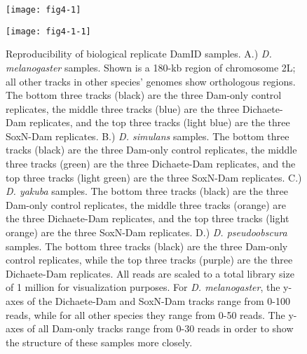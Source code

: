 \begin{figure}[H]
	\centering
	\texttt{[image: fig4-1]}
	\label{Figure 4.1}
\end{figure}

\begin{figure}[H]
\centering
\texttt{[image: fig4-1-1]}
\caption{Reproducibility of biological replicate DamID samples. A.) \emph{D. melanogaster} samples. Shown is a 180-kb region of chromosome 2L; all other tracks in other species’ genomes show orthologous regions. The bottom three tracks (black) are the three Dam-only control replicates, the middle three tracks (blue) are the three Dichaete-Dam replicates, and the top three tracks (light blue) are the three SoxN-Dam replicates. B.) \emph{D. simulans} samples. The bottom three tracks (black) are the three Dam-only control replicates, the middle three tracks (green) are the three Dichaete-Dam replicates, and the top three tracks (light green) are the three SoxN-Dam replicates. C.) \emph{D. yakuba} samples. The bottom three tracks (black) are the three Dam-only control replicates, the middle three tracks (orange) are the three Dichaete-Dam replicates, and the top three tracks (light orange) are the three SoxN-Dam replicates. D.) \emph{D. pseudoobscura} samples. The bottom three tracks (black) are the three Dam-only control replicates, while the top three tracks (purple) are the three Dichaete-Dam replicates. All reads are scaled to a total library size of 1 million for visualization purposes. For \emph{D. melanogaster}, the y-axes of the Dichaete-Dam and SoxN-Dam tracks range from 0-100 reads, while for all other species they range from 0-50 reads. The y-axes of all Dam-only tracks range from 0-30 reads in order to show the structure of these samples more closely.}
\label{Figure 4.1}
\end{figure}

